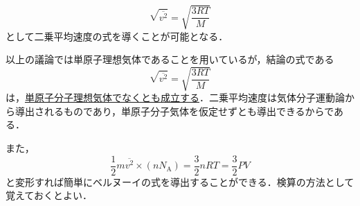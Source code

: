 \begin{multicols}{2}
\begin{breakbox}
\[\sqrt{\overline{v^2}}=\sqrt{\frac{3RT}{M}}\]
として二乗平均速度の式を導くことが可能となる．\par
\hspace*{1zw}以上の議論では単原子理想気体であることを用いているが，結論の式である
\[\sqrt{\overline{v^2}}=\sqrt{\frac{3RT}{M}}\]
は，\underline{単原子}\hskip0pt\underline{分子理}\hskip0pt\underline{想気体}\hskip0pt\underline{でなく}\hskip0pt\underline{とも成}\hskip0pt\underline{立する}．二乗平均速度は気体分子運動論から導出されるものであり，単原子分子気体を仮定せずとも導出できるからである．\par
\hspace*{1zw}また，
\[\frac{1}{2}m\overline{v^2}\times(nN_{\mathrm{A}})=\frac{3}{2}nRT=\frac{3}{2}PV\]
と変形すれば簡単にベルヌーイの式を導出することができる．検算の方法として覚えておくとよい．
\end{breakbox}


\end{multicols}
